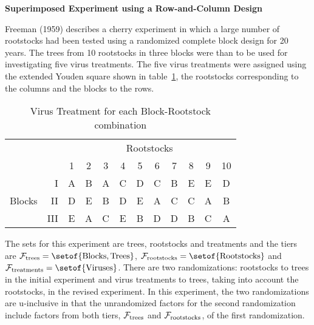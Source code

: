 \begin{flushleft}\Large\bf Superimposed Experiment using a Row-and-Column Design
\end{flushleft}

\nocite{Freeman59}Free\-man (1959) describes a cherry experiment in which a
large number of rootstocks had been tested using a randomized complete
block design for 20 years.  The trees from 10 rootstocks in three blocks
were than to be used for investigating five virus treatments.  The five
virus treatments were assigned using the extended Youden square 
shown in table~\ref{t:SuperBIBD},  the rootstocks corresponding to the
columns and the blocks to the rows.

\begin{table}[htbp]
\begin{center}\begin{tabular}{lr|*{10}{c}}
 &  & \multicolumn{10}{c}{Rootstocks} \\
       &     & 1 & 2 & 3 & 4 & 5 & 6 & 7 & 8 & 9 & 10 \\
\hline
       &   I & A & B & A & C & D & C & B & E & E & D  \\
Blocks &  II & D & E & B & D & E & A & C & C & A & B  \\
       & III & E & A & C & E & B & D & D & B & C & A  \\
\end{tabular}\end{center}
\caption{\label{t:SuperBIBD}Virus Treatment for each Block-Rootstock 
combination}
\end{table}

The sets for this experiment are trees, rootstocks and treatments and the
tiers are ${\cal F}_{\rm trees} = \setof{\mbox{Blocks}, \mbox{Trees}}$,
${\cal F}_{\rm rootstocks} = \setof{\mbox{Rootstocks}}$ and ${\cal
F}_{\rm treatments} = \setof{\mbox{Viruses}}$.  There are two
randomizations: rootstocks to trees in the initial experiment and virus
treatments to trees, taking into account the rootstocks, in the revised
experiment.  In this experiment, the two randomizations are u-inclusive in
that the unrandomized factors for the second randomization include factors 
from both tiers, ${\cal F}_{\rm trees}$ and ${\cal F}_{\rm rootstocks}$, of 
the first randomization.


